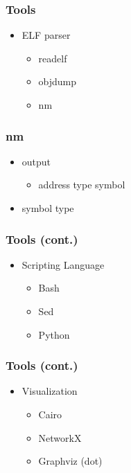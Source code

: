\begin{frame}[t]
	\frametitle{Tools}
	\begin{itemize}
		\item ELF parser
		\begin{itemize}
			\item<+-|alert@+> readelf
			\item<+-|alert@+> objdump
			\item<+-|alert@+> nm
		\end{itemize}
	\end{itemize}
\end{frame}

\begin{frame}[t]
	\frametitle{nm}
	\begin{itemize}
		\item<+-|alert@+> output
		\begin{itemize}
			\item<+-|alert@+> address type symbol
		\end{itemize}
		\item<+-|alert@+> symbol type
	\end{itemize}
\end{frame}

\begin{frame}[t]
	\frametitle{Tools (cont.)}
	\begin{itemize}
		\item Scripting Language
		\begin{itemize}
			\item<+-|alert@+> Bash
			\item<+-|alert@+> Sed
			\item<+-|alert@+> Python
		\end{itemize}
	\end{itemize}
\end{frame}

\begin{frame}[t]
	\frametitle{Tools (cont.)}
	\begin{itemize}
		\item Visualization
		\begin{itemize}
			\item<+-|alert@+> Cairo
			\item<+-|alert@+> NetworkX
			\item<+-|alert@+> Graphviz (dot)
		\end{itemize}
	\end{itemize}
\end{frame}

